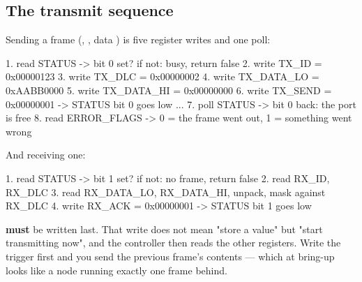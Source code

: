 \subsection{The transmit sequence}

Sending a frame (, , data ) is five register writes and one
poll:

\begin{console}
1. read  STATUS        -> bit 0 set? if not: busy, return false
2. write TX_ID         = 0x00000123
3. write TX_DLC        = 0x00000002
4. write TX_DATA_LO    = 0xAABB0000
5. write TX_DATA_HI    = 0x00000000
6. write TX_SEND       = 0x00000001      -> STATUS bit 0 goes low
   ...
7. poll  STATUS        -> bit 0 back: the port is free
8. read  ERROR_FLAGS   -> 0 = the frame went out, 1 = something went wrong
\end{console}

And receiving one:

\begin{console}
1. read  STATUS        -> bit 1 set? if not: no frame, return false
2. read  RX_ID, RX_DLC
3. read  RX_DATA_LO, RX_DATA_HI, unpack, mask against RX_DLC
4. write RX_ACK        = 0x00000001      -> STATUS bit 1 goes low
\end{console}

 \textbf{must} be written last. That write does not mean "store a value" but "start
transmitting now", and the controller then reads the other registers. Write the trigger first and
you send the previous frame's contents --- which at bring-up looks like a node running exactly one
frame behind.
